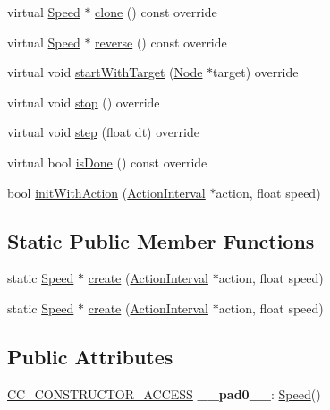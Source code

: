 \begin{DoxyCompactItemize}
\item 
virtual \hyperlink{classSpeed}{Speed} $\ast$ \hyperlink{classSpeed_a3d2902e3bce456bd031a8692bbe22d4d}{clone} () const override
\item 
virtual \hyperlink{classSpeed}{Speed} $\ast$ \hyperlink{classSpeed_a7712f6aa442c6b93306e78c1d18f54d4}{reverse} () const override
\item 
virtual void \hyperlink{classSpeed_a09fda22493c3b5d8367f7b935168dfbb}{start\+With\+Target} (\hyperlink{classNode}{Node} $\ast$target) override
\item 
virtual void \hyperlink{classSpeed_a7580890ff2db1634273c0b726c023098}{stop} () override
\item 
virtual void \hyperlink{classSpeed_affaf70de829e3452df106ec55a238807}{step} (float dt) override
\item 
virtual bool \hyperlink{classSpeed_a6897f29e4fc1c8515fc12f9e98ebebef}{is\+Done} () const override
\item 
bool \hyperlink{classSpeed_a4e2c8023a20b7093c9dd8f5b6838ef70}{init\+With\+Action} (\hyperlink{classActionInterval}{Action\+Interval} $\ast$action, float speed)
\end{DoxyCompactItemize}
\subsection*{Static Public Member Functions}
\begin{DoxyCompactItemize}
\item 
static \hyperlink{classSpeed}{Speed} $\ast$ \hyperlink{classSpeed_ada56fcb628e1b9c8a40b2a8242351534}{create} (\hyperlink{classActionInterval}{Action\+Interval} $\ast$action, float speed)
\item 
static \hyperlink{classSpeed}{Speed} $\ast$ \hyperlink{classSpeed_a0756d995012f1dab22bf8e03e0caf171}{create} (\hyperlink{classActionInterval}{Action\+Interval} $\ast$action, float speed)
\end{DoxyCompactItemize}
\subsection*{Public Attributes}
\begin{DoxyCompactItemize}
\item 
\mbox{\label{classSpeed_a3fe99cf661dda40812f0063f88d32567}} 
\hyperlink{_2cocos2d_2cocos_2base_2ccConfig_8h_a25ef1314f97c35a2ed3d029b0ead6da0}{C\+C\+\_\+\+C\+O\+N\+S\+T\+R\+U\+C\+T\+O\+R\+\_\+\+A\+C\+C\+E\+SS} {\bfseries \+\_\+\+\_\+pad0\+\_\+\+\_\+}\+: \hyperlink{classSpeed}{Speed}()
\end{DoxyCompactItemize}
